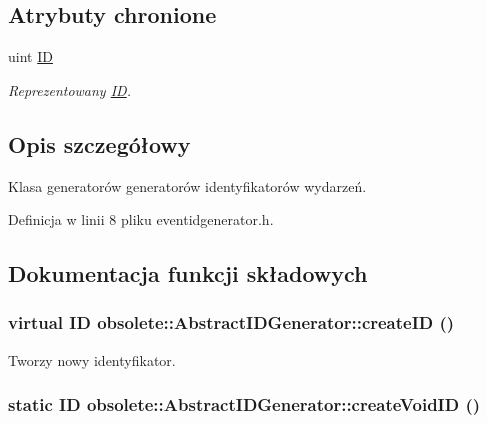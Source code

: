 \subsection*{Atrybuty chronione}
\begin{DoxyCompactItemize}
\item 
uint \hyperlink{classobsolete_1_1AbstractID_a5f67fa1c7d96085f0ef41193b60b570c}{ID}
\begin{DoxyCompactList}\small\item\em Reprezentowany \hyperlink{classobsolete_1_1ID}{ID}. \item\end{DoxyCompactList}\end{DoxyCompactItemize}


\subsection{Opis szczegółowy}
Klasa generatorów generatorów identyfikatorów wydarzeń. 

Definicja w linii 8 pliku eventidgenerator.h.



\subsection{Dokumentacja funkcji składowych}
\hypertarget{classobsolete_1_1AbstractIDGenerator_a39d2f0147e3a028fef8299770e23db90}{
\subsubsection[{createID}]{\setlength{\rightskip}{0pt plus 5cm}virtual {\bf ID} obsolete::AbstractIDGenerator::createID ()}}
\label{classobsolete_1_1AbstractIDGenerator_a39d2f0147e3a028fef8299770e23db90}


Tworzy nowy identyfikator. 

\hypertarget{classobsolete_1_1AbstractIDGenerator_a330da88ba80820ca6ce0a29cbbab9e1b}{
\subsubsection[{createVoidID}]{\setlength{\rightskip}{0pt plus 5cm}static {\bf ID} obsolete::AbstractIDGenerator::createVoidID ()}}
\label{classobsolete_1_1AbstractIDGenerator_a330da88ba80820ca6ce0a29cbbab9e1b}


